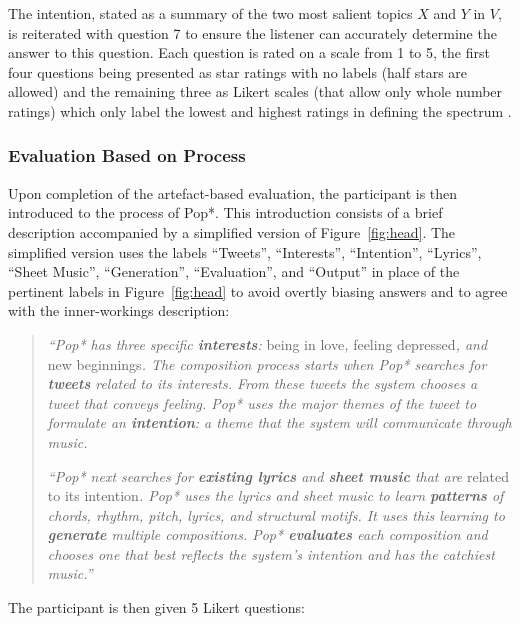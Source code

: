 \documentclass[phd,electronic,oneside,twosidetoc,letterpaper,chaptercenter,parttop,lol,lof,lot]{byumsphd}
\begin{document}
\noindent The intention, stated as a summary of the two most salient topics $X$ and $Y$ in $V$, is reiterated with question 7 to ensure the listener can accurately determine the answer to this question. Each question is rated on a scale from 1 to 5, the first four questions being presented as star ratings with no labels (half stars are allowed) and the remaining three as Likert scales (that allow only whole number ratings) which only label the lowest and highest ratings in defining the spectrum \citep{likert1932technique}.

\subsubsection{Evaluation Based on Process} Upon completion of the artefact-based evaluation, the participant is then introduced to the process of Pop*. This introduction consists of a brief description accompanied by a simplified version of Figure~\ref{fig:head}. The simplified version uses the labels ``Tweets'', ``Interests'', ``Intention'', ``Lyrics'', ``Sheet Music'', ``Generation'', ``Evaluation'', and ``Output'' in place of the pertinent labels in Figure~\ref{fig:head} to avoid overtly biasing answers and to agree with the inner-workings description:

\begin{quote}
\textit{``Pop* has three specific \textbf{interests}:} being in love\textit{,} feeling depressed\textit{, and} new beginnings\textit{. The composition process starts when Pop* searches for \textbf{tweets} related to its interests. From these tweets the system chooses a tweet that conveys feeling. Pop* uses the major themes of the tweet to formulate an \textbf{intention}: a theme that the system will communicate through music.}
 
\textit{``Pop* next searches for \textbf{existing lyrics} and \textbf{sheet music} that are} related to its intention\textit{. Pop* uses the lyrics and sheet music to learn \textbf{patterns} of chords, rhythm, pitch, lyrics, and structural motifs. It uses this learning to \textbf{generate} multiple compositions. Pop* \textbf{evaluates} each composition and chooses one that best reflects the system's intention and has the catchiest music.''}
\end{quote}

The participant is then given 5 Likert questions:
\end{document}
